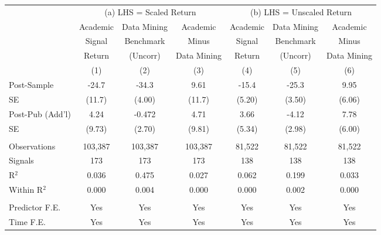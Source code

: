 \begingroup
\setlength{\tabcolsep}{0.55ex}%
\centering
\begin{tabular}{lcccccc}
   \toprule
                    & \multicolumn{3}{c}{(a) LHS = Scaled Return} & \multicolumn{3}{c}{(b) LHS = Unscaled Return} \\
   \cmidrule(lr){2-4}\cmidrule(lr){5-7}
                    & Academic
                    & Data Mining
                    & Academic
                    & Academic
                    & Data Mining
                    & Academic \\
                    & Signal
                    & Benchmark
                    & Minus
                    & Signal
                    & Benchmark
                    & Minus \\
                    & Return
                    & (Uncorr)
                    & Data Mining
                    & Return
                    & (Uncorr)
                    & Data Mining \\
                    & (1) & (2) & (3) & (4) & (5) & (6) \\
   \midrule
   Post-Sample      & -24.7 & -34.3 & 9.61 & -15.4 & -25.3 & 9.95 \\
   SE               & (11.7) & (4.00) & (11.7) & (5.20) & (3.50) & (6.06) \\
   Post-Pub (Add'l) & 4.24 & -0.472 & 4.71 & 3.66 & -4.12 & 7.78 \\
   SE               & (9.73) & (2.70) & (9.81) & (5.34) & (2.98) & (6.00) \\
   \\
   Observations     & 103,387 & 103,387 & 103,387 & 81,522 & 81,522 & 81,522 \\
   Signals          & 173 & 173 & 173 & 138 & 138 & 138 \\
   R$^2$            & 0.036 & 0.475 & 0.027 & 0.062 & 0.199 & 0.033 \\
   Within R$^2$     & 0.000 & 0.004 & 0.000 & 0.000 & 0.002 & 0.000 \\
   \\
   Predictor F.E.   & Yes & Yes & Yes & Yes & Yes & Yes \\
   Time F.E.        & Yes & Yes & Yes & Yes & Yes & Yes \\
   \bottomrule
\end{tabular}
\par\endgroup
